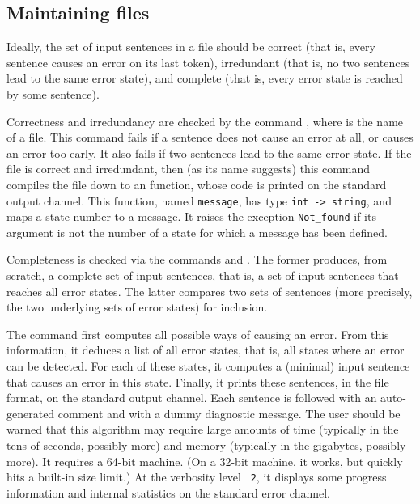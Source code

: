 \documentclass[onecolumn,11pt,nocopyrightspace,preprint]{sigplanconf}
\begin{document}

\subsection{Maintaining \messages files}
\label{sec:messages:tools}

Ideally, the set of input sentences in a \messages file should be correct
(that is, every sentence causes an error on its last token), irredundant (that
is, no two sentences lead to the same error state), and complete (that is,
every error state is reached by some sentence).

Correctness and irredundancy are checked by the
command \ocompileerrors {}, where  is the name of
a \messages file. This command fails if a sentence does not cause an error at
all, or causes an error too early. It also fails if two sentences lead to the
same error state.
%
If the file is correct and irredundant, then (as its name suggests) this
command compiles the \messages file down to an \ocaml function, whose code
is printed on the standard output channel. This function, named \verb+message+,
has type \verb+int -> string+, and maps a state number to a message. It
raises the exception \verb+Not_found+ if its argument is not the number of
a state for which a message has been defined.

Completeness is checked via the commands \olisterrors and
\ocompareerrors. The former produces, from scratch, a complete
set of input sentences, that is, a set of input sentences that reaches all
error states. The latter compares two sets of sentences (more precisely,
the two underlying sets of error states) for inclusion.

The command \olisterrors first computes all possible ways of causing an error.
From this information, it deduces a list of all error states, that is, all
states where an error can be detected. For each of these states, it computes a
(minimal) input sentence that causes an error in this state. Finally, it
prints these sentences, in the \messages file format, on the standard output
channel. Each sentence is followed with an auto-generated comment and with a
dummy diagnostic message. The user should be warned that this algorithm may
require large amounts of time (typically in the tens of seconds, possibly
more) and memory (typically in the gigabytes, possibly more). It requires a
64-bit machine. (On a 32-bit machine, it works, but quickly hits a built-in
size limit.) At the verbosity level \ologautomaton~\texttt{2}, it displays
some progress information and internal statistics on the standard error
channel.
\end{document}
